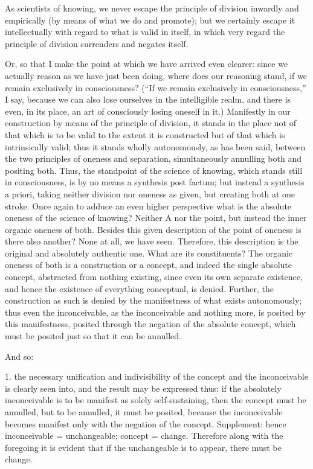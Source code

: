 As scientists of knowing, we never escape
the principle of division inwardly and empirically
(by means of what we do and promote);
but we certainly escape it intellectually
with regard to what is valid in itself,
in which very regard the principle of division
surrenders and negates itself.

Or, so that I make the point at which
we have arrived even clearer:
since we actually reason as we have just been doing,
where does our reasoning stand,
if we remain exclusively in consciousness?
(“If we remain exclusively in consciousness,”
I say, because we can also lose ourselves
in the intelligible realm,
and there is even, in its place,
an art of consciously losing oneself in it.)
Manifestly in our construction
by means of the principle of division,
it stands in the place not of that which is to be
valid to the extent it is constructed
but of that which is intrinsically valid;
thus it stands wholly autonomously, as has been said,
between the two principles of oneness and separation,
simultaneously annulling both and positing both.
Thus, the standpoint of the science of knowing,
which stands still in consciousness,
is by no means a synthesis post factum;
but instead a synthesis a priori,
taking neither division nor oneness as given,
but creating both at one stroke.
Once again to adduce an even higher perspective
what is the absolute oneness of the science of knowing?
Neither A nor the point,
but instead the inner organic oneness of both.
Besides this given description of
the point of oneness
is there also another?
None at all, we have seen.
Therefore, this description is
the original and absolutely authentic one.
What are its constituents?
The organic oneness of both is
a construction or a concept,
and indeed the single absolute concept,
abstracted from nothing existing,
since even its own separate existence,
and hence the existence of everything conceptual,
is denied.
Further, the construction as such is denied
by the manifestness of what exists autonomously;
thus even the inconceivable, as the inconceivable
and nothing more, is posited by this manifestness,
posited through the negation of the absolute concept,
which must be posited just so that it can be annulled.

And so:

1. the necessary unification and indivisibility
of the concept and the inconceivable is clearly seen into,
and the result may be expressed thus:
if the absolutely inconceivable is to be
manifest as solely self-sustaining,
then the concept must be annulled,
but to be annulled, it must be posited,
because the inconceivable becomes manifest
only with the negation of the concept.
Supplement: hence inconceivable = unchangeable; concept = change.
Therefore along with the foregoing it is evident that
if the unchangeable is to appear, there must be change.

